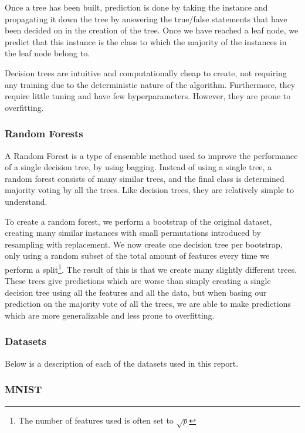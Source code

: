 \documentclass[onecolumn,10pt,cleanfoot]{asme2ej}
\begin{document}
Once a tree has been built, prediction is done by taking the instance and propagating it down the tree by answering the true/false statements that have been decided on in the creation of the tree. Once we have reached a leaf node, we predict that this instance is the class to which the majority of the instances in the leaf node belong to.

Decision trees are intuitive and computationally cheap to create, not requiring any training due to the deterministic nature of the algorithm. Furthermore, they require little tuning and have few hyperparameters. However, they are prone to overfitting.

\subsubsection{Random Forests}

A Random Forest is a type of ensemble method used to improve the performance of a single decision tree, by using bagging. Instead of using a single tree, a random forest consists of many similar trees, and the final class is determined majority voting by all the trees. Like decision trees, they are relatively simple to understand.

To create a random forest, we perform a bootstrap of the original dataset, creating many similar instances with small permutations introduced by resampling with replacement. We now create one decision tree per bootstrap, only using a random subset of the total amount of features every time we perform a split\footnote{The number of features used is often set to $\sqrt{p}$}. The result of this is that we create many slightly different trees. These trees give predictions which are worse than simply creating a single decision tree using all the features and all the data, but when basing our prediction on the majority vote of all the trees, we are able to make predictions which are more generalizable and less prone to overfitting.

\subsubsection{Datasets}

Below is a description of each of the datasets used in this report.

\subsubsection{MNIST}
\end{document}
